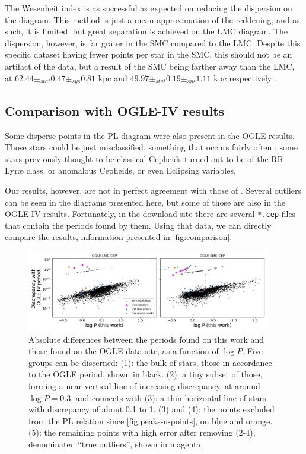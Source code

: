 The Wesenheit index is as successful as expected on reducing the dispersion on the diagram.
This method is just a mean approximation of the reddening, and as such, it is limited, but great separation is achieved on the LMC diagram.
The dispersion, however, is far grater in the SMC compared to the LMC. 
Despite this specific dataset having fewer points per star in the SMC, this should not be an artifact of the data, 
but a result of the SMC being farther away than the LMC, at $62.44 \pm_{stat} 0.47 \pm_{sys}0.81$ kpc 
and $49.97 \pm_{stat} 0.19 \pm_{sys} 1.11$ kpc respectively \citep{SMC2020,LMC2013}.

\subsection{Comparison with OGLE-IV results}


Some disperse points in the PL diagram were also present in the OGLE results. 
Those stars could be just misclassified, something that occurs fairly often \citep[see for example Table 1 of][]{OGLE2016};
some stars previously thought to be classical Cepheids turned out to be of the RR Lyr\ae{} class,
or anomalous Cepheids, or even Eclipsing variables.

Our results, however, are not in perfect agreement with those of \cite{OGLE2016}.
Several outliers can be seen in the diagrams presented here, but some of those are also in the OGLE-IV results.
Fortunately, in the download site there are several \texttt{*.cep} files that contain the periods found by them.
Using that data, we can directly compare the results, information presented in \autoref{fig:comparison}.

\begin{figure}
	\centering
	\includegraphics[width=0.95\textwidth]{img/discrepancies.pdf}
	\caption[Results: comparison with OGLE-IV periods]{
		Absolute differences between the periods found on this work and those found on the OGLE data site, as a function of $\log P$.
		Five groups can be discerned: (1): the bulk of stars, those in accordance to the OGLE period, shown in black. 
		(2): a tiny subset of those, forming a near vertical line of increasing discrepancy, at around  $\log P = 0.3$, and connects with
		(3): a thin horizontal line of stars with discrepancy of about 0.1 to 1.
		(3) and (4): the points excluded from the PL relation since \autoref{fig:peaks-n-points}, on blue and orange.
		(5): the remaining points with high error after removing (2-4), denominated \enquote{true outliers}, shown in magenta.
	}
	\label{fig:comparison}
\end{figure}

